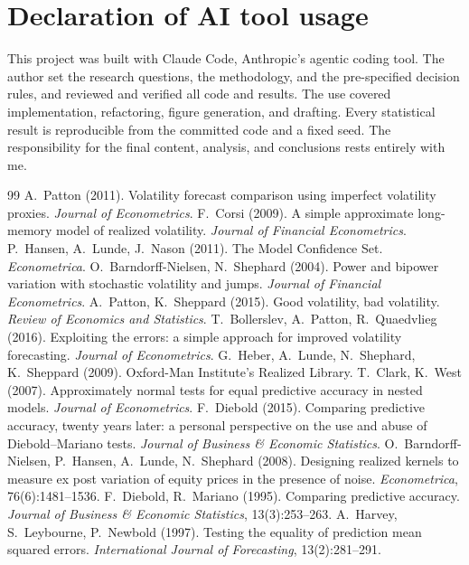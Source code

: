 \documentclass[11pt]{article}
\begin{document}
\section*{Declaration of AI tool usage}
This project was built with Claude Code, Anthropic's agentic coding tool.
The author set the research questions, the methodology, and the pre-specified
decision rules, and reviewed and verified all code and results. The use covered
implementation, refactoring, figure generation, and drafting. Every statistical
result is reproducible from the committed code and a fixed seed. The responsibility
for the final content, analysis, and conclusions rests entirely with me.

\begin{thebibliography}{99}
 A.~Patton (2011). Volatility forecast comparison using imperfect volatility proxies. \emph{Journal of Econometrics}.
 F.~Corsi (2009). A simple approximate long-memory model of realized volatility. \emph{Journal of Financial Econometrics}.
 P.~Hansen, A.~Lunde, J.~Nason (2011). The Model Confidence Set. \emph{Econometrica}.
 O.~Barndorff-Nielsen, N.~Shephard (2004). Power and bipower variation with stochastic volatility and jumps. \emph{Journal of Financial Econometrics}.
 A.~Patton, K.~Sheppard (2015). Good volatility, bad volatility. \emph{Review of Economics and Statistics}.
 T.~Bollerslev, A.~Patton, R.~Quaedvlieg (2016). Exploiting the errors: a simple approach for improved volatility forecasting. \emph{Journal of Econometrics}.
 G.~Heber, A.~Lunde, N.~Shephard, K.~Sheppard (2009). Oxford-Man Institute's Realized Library.
 T.~Clark, K.~West (2007). Approximately normal tests for equal predictive accuracy in nested models. \emph{Journal of Econometrics}.
 F.~Diebold (2015). Comparing predictive accuracy, twenty years later: a personal perspective on the use and abuse of Diebold--Mariano tests. \emph{Journal of Business \& Economic Statistics}.
 O.~Barndorff-Nielsen, P.~Hansen, A.~Lunde, N.~Shephard (2008). Designing realized kernels to measure ex post variation of equity prices in the presence of noise. \emph{Econometrica}, 76(6):1481--1536.
 F.~Diebold, R.~Mariano (1995). Comparing predictive accuracy. \emph{Journal of Business \& Economic Statistics}, 13(3):253--263.
 A.~Harvey, S.~Leybourne, P.~Newbold (1997). Testing the equality of prediction mean squared errors. \emph{International Journal of Forecasting}, 13(2):281--291.

\end{thebibliography}
\end{document}
